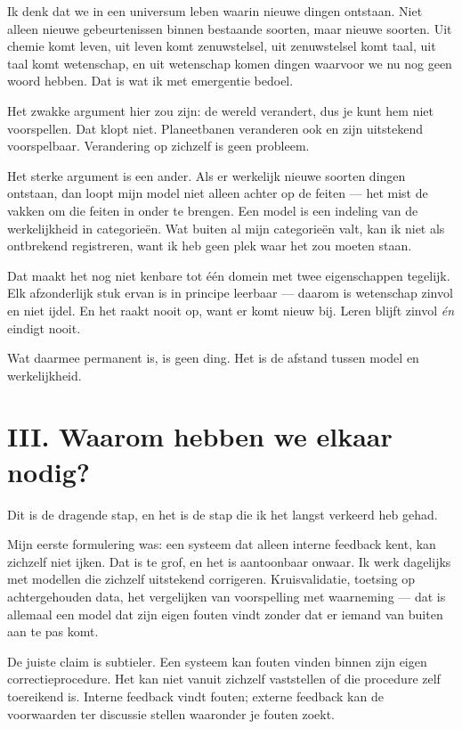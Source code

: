 \documentclass[11pt,a4paper]{article}
\begin{document}
Ik denk dat we in een universum leben waarin nieuwe dingen ontstaan. Niet alleen nieuwe gebeurtenissen binnen bestaande soorten, maar nieuwe soorten. Uit chemie komt leven, uit leven komt zenuwstelsel, uit zenuwstelsel komt taal, uit taal komt wetenschap, en uit wetenschap komen dingen waarvoor we nu nog geen woord hebben. Dat is wat ik met emergentie bedoel.

Het zwakke argument hier zou zijn: de wereld verandert, dus je kunt hem niet voorspellen. Dat klopt niet. Planeetbanen veranderen ook en zijn uitstekend voorspelbaar. Verandering op zichzelf is geen probleem.

Het sterke argument is een ander. Als er werkelijk nieuwe soorten dingen ontstaan, dan loopt mijn model niet alleen achter op de feiten --- het mist de vakken om die feiten in onder te brengen. Een model is een indeling van de werkelijkheid in categorieën. Wat buiten al mijn categorieën valt, kan ik niet als ontbrekend registreren, want ik heb geen plek waar het zou moeten staan.

Dat maakt het nog niet kenbare tot één domein met twee eigenschappen tegelijk. Elk afzonderlijk stuk ervan is in principe leerbaar --- daarom is wetenschap zinvol en niet ijdel. En het raakt nooit op, want er komt nieuw bij. Leren blijft zinvol \textit{én} eindigt nooit.

Wat daarmee permanent is, is geen ding. Het is de afstand tussen model en werkelijkheid.

\section*{III. Waarom hebben we elkaar nodig?}

Dit is de dragende stap, en het is de stap die ik het langst verkeerd heb gehad.

Mijn eerste formulering was: een systeem dat alleen interne feedback kent, kan zichzelf niet ijken. Dat is te grof, en het is aantoonbaar onwaar. Ik werk dagelijks met modellen die zichzelf uitstekend corrigeren. Kruisvalidatie, toetsing op achtergehouden data, het vergelijken van voorspelling met waarneming --- dat is allemaal een model dat zijn eigen fouten vindt zonder dat er iemand van buiten aan te pas komt.

De juiste claim is subtieler. Een systeem kan fouten vinden binnen zijn eigen correctieprocedure. Het kan niet vanuit zichzelf vaststellen of die procedure zelf toereikend is. Interne feedback vindt fouten; externe feedback kan de voorwaarden ter discussie stellen waaronder je fouten zoekt.
\end{document}
